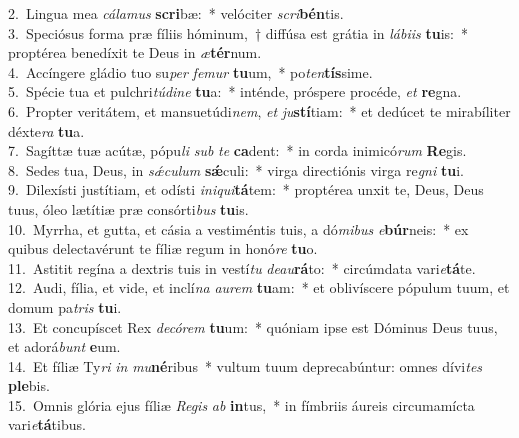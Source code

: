 {2.~}Lingua mea \textit{cá}\textit{la}\textit{mus} \textbf{scri}bæ:~* velóciter \textit{scri}\textbf{bén}tis.\\
{3.~}Speciósus forma præ fíliis hóminum,~† diffúsa est grátia in \textit{lá}\textit{bi}\textit{is} \textbf{tu}is:~* proptérea benedíxit te Deus in \textit{æ}\textbf{tér}num.\\
{4.~}Accíngere gládio tuo su\textit{per} \textit{fe}\textit{mur} \textbf{tu}um,~* po\textit{ten}\textbf{tís}sime.\\
{5.~}Spécie tua et pulchri\textit{tú}\textit{di}\textit{ne} \textbf{tu}a:~* inténde, próspere procéde, \textit{et} \textbf{re}gna.\\
{6.~}Propter veritátem, et mansuetúdi\textit{nem}, \textit{et} \textit{ju}\textbf{stí}tiam:~* et dedúcet te mirabíliter déxte\textit{ra} \textbf{tu}a.\\
{7.~}Sagíttæ tuæ acútæ, pópu\textit{li} \textit{sub} \textit{te} \textbf{ca}dent:~* in corda inimicó\textit{rum} \textbf{Re}gis.\\
{8.~}Sedes tua, Deus, in \textit{sǽ}\textit{cu}\textit{lum} \textbf{sǽ}culi:~* virga directiónis virga re\textit{gni} \textbf{tu}i.\\
{9.~}Dilexísti justítiam, et odísti \textit{i}\textit{ni}\textit{qui}\textbf{tá}tem:~* proptérea unxit te, Deus, Deus tuus, óleo lætítiæ præ consórti\textit{bus} \textbf{tu}is.\\
{10.~}Myrrha, et gutta, et cásia a vestiméntis tuis, a dó\textit{mi}\textit{bus} \textit{e}\textbf{búr}neis:~* ex quibus delectavérunt te fíliæ regum in honó\textit{re} \textbf{tu}o.\\
{11.~}Astitit regína a dextris tuis in vestí\textit{tu} \textit{de}\textit{au}\textbf{rá}to:~* circúmdata vari\textit{e}\textbf{tá}te.\\
{12.~}Audi, fília, et vide, et inclí\textit{na} \textit{au}\textit{rem} \textbf{tu}am:~* et oblivíscere pópulum tuum, et domum pa\textit{tris} \textbf{tu}i.\\
{13.~}Et concupíscet Rex \textit{de}\textit{có}\textit{rem} \textbf{tu}um:~* quóniam ipse est Dóminus Deus tuus, et adorá\textit{bunt} \textbf{e}um.\\
{14.~}Et fíliæ Ty\textit{ri} \textit{in} \textit{mu}\textbf{né}ribus~* vultum tuum deprecabúntur: omnes dívi\textit{tes} \textbf{ple}bis.\\
{15.~}Omnis glória ejus fíliæ \textit{Re}\textit{gis} \textit{ab} \textbf{in}tus,~* in fímbriis áureis circumamícta vari\textit{e}\textbf{tá}tibus.\\
